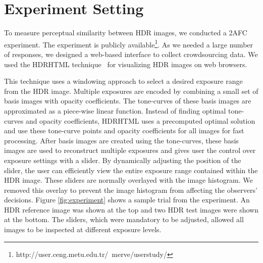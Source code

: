 \section{Experiment Setting}
To measure perceptual similarity between HDR images, we conducted a 2AFC experiment. The experiment is publicly available\footnote{http://user.ceng.metu.edu.tr/~merve/userstudy/}. As we needed a large number of responses, we designed a web-based interface to collect crowdsourcing data. We used the HDRHTML technique~\cite{mantiuk2009visualizing} for visualizing HDR images on web browsers.

This technique uses a windowing approach to select a desired exposure range from the HDR image. Multiple exposures are encoded by combining a small set of basis images with opacity coefficients. The tone-curves of these basis images are approximated as a piece-wise linear function. Instead of finding optimal tone-curves and opacity coefficients, HDRHTML uses a precomputed optimal solution and use these tone-curve points and opacity coefficients for all images for fast processing. After basis images are created using the tone-curves, these basis images are used to reconstruct multiple exposures and gives user the control over exposure settings with a slider. By dynamically adjusting the position of the slider, the user can efficiently view the entire exposure range contained within the HDR image. These sliders are normally overlayed with the image histogram. We removed this overlay to prevent the image histogram from affecting the observers’ decisions. Figure \ref{fig:experiment} shows a sample trial from the experiment. An HDR reference image was shown at the top and two HDR test images were shown at the bottom. The sliders, which were mandatory to be adjusted, allowed all images to be inspected at different exposure levels.

